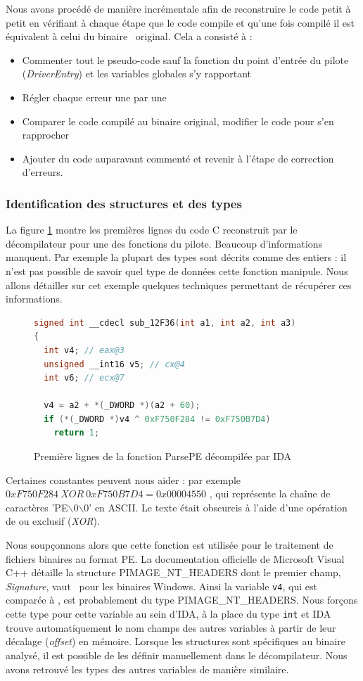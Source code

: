 Nous avons procédé de manière incrémentale afin de reconstruire le code petit à petit en vérifiant à chaque étape que le code compile et qu'une fois compilé il est équivalent à celui du binaire \driver\ original. 
Cela a consisté à :
\begin{itemize}
 \item Commenter tout le pseudo-code sauf la fonction du point d'entrée du pilote (\emph{DriverEntry}) et les variables globales s'y rapportant
 \item Régler chaque erreur une par une
 \item Comparer le code compilé au binaire original, modifier le code pour s'en rapprocher
 \item Ajouter du code auparavant commenté et revenir à l'étape de correction d'erreurs.
\end{itemize}

\subsubsection{Identification des structures et des types}
La figure \ref{fig:ParsePEInitial} montre les premières lignes du code C reconstruit par le décompilateur pour une des fonctions du pilote.
Beaucoup d'informations manquent. Par exemple la plupart des types sont décrits comme des entiers : il n'est pas possible de savoir quel type de données cette fonction manipule.
Nous allons détailler sur cet exemple quelques techniques permettant de récupérer ces informations.

\begin{figure}[h]
\begin{lstlisting}[language={C}]
signed int __cdecl sub_12F36(int a1, int a2, int a3)
{
  int v4; // eax@3
  unsigned __int16 v5; // cx@4
  int v6; // ecx@7

  v4 = a2 + *(_DWORD *)(a2 + 60);
  if (*(_DWORD *)v4 ^ 0xF750F284 != 0xF750B7D4)
    return 1;
\end{lstlisting}
\caption{Première lignes de la fonction ParsePE décompilée par IDA\label{fig:ParsePEInitial}}
\end{figure}

Certaines constantes peuvent nous aider : par exemple $0xF750F284\ XOR\ 0xF750B7D4 = 0x00004550$ , qui représente la chaîne de caractères 'PE$\backslash$0$\backslash$0' en ASCII. Le texte était obscurcis à l'aide d'une opération de ou exclusif (\emph{XOR}).

Nous soupçonnons alors que cette fonction est utilisée pour le traitement de fichiers binaires au format PE.
La documentation officielle de Microsoft Visual C++ détaille la structure PIMAGE\_NT\_HEADERS dont le premier champ, \emph{Signature}, vaut \PEzz\ pour les binaires Windows.
Ainsi la variable \texttt{v4}, qui est comparée à \PEzz, est probablement du type PIMAGE\_NT\_HEADERS.
Nous forçons cette type pour cette variable au sein d'IDA, à la place du type \texttt{int} et IDA trouve automatiquement le nom champs des autres variables à partir de leur décalage (\emph{offset}) en mémoire.
Lorsque les structures sont spécifiques au binaire analysé, il est possible de les définir manuellement dans le décompilateur.
Nous avons retrouvé les types des autres variables de manière similaire.

